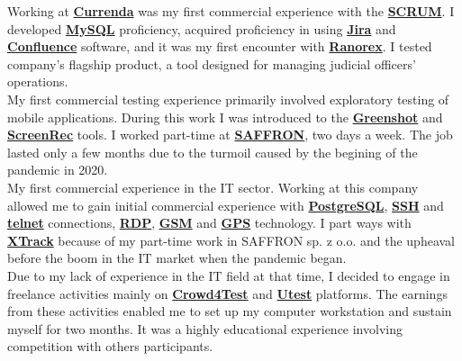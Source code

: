 \begin{rightcolumn}
            {Working at \href{https://www.currenda.pl/}{\textbf{Currenda}} was my first commercial experience with the \href{https://www.scrum.org/}{\textbf{SCRUM}}. I developed \href{https://www.mysql.com/}{\textbf{MySQL}} proficiency, acquired proficiency in using \href{https://www.atlassian.com/pl/software/jira}{\textbf{Jira}} and \href{https://www.atlassian.com/pl/software/confluence}{\textbf{Confluence}} software, and it was my first encounter with \href{https://www.ranorex.com/}{\textbf{Ranorex}}. I tested company's flagship product, a tool designed for managing judicial officers' operations.}
        \vspace{\itemspace}\\
            {My first commercial testing experience primarily involved exploratory testing of mobile applications. During this work I was introduced to the \href{https://getgreenshot.org/}{\textbf{Greenshot}} and \href{https://screenrec.com/}{\textbf{ScreenRec}} tools. I worked part-time at \href{https://saffron.pl/}{\textbf{SAFFRON}}, two days a week. The job lasted only a few months due to the turmoil caused by the begining of the pandemic in 2020.}
        \vspace{\itemspace}\\
            {My first commercial experience in the IT sector. Working at this company allowed me to gain initial commercial experience with \href{https://www.postgresql.org/}{\textbf{PostgreSQL}}, \href{https://www.openssh.com/}{\textbf{SSH}} and \href{https://www.telnet.org/}{\textbf{telnet}} connections, \href{https://learn.microsoft.com/en-us/windows/security/identity-protection/hello-for-business/hello-feature-remote-desktop}{\textbf{RDP}}, \href{https://www.gsma.com/}{\textbf{GSM}} and \href{https://www.gps.gov/}{\textbf{GPS}} technology. I part ways with \href{https://xtrack.com/}{\textbf{XTrack}} because of my part-time work in SAFFRON sp. z o.o. and the upheaval before the boom in the IT market when the pandemic began.}
        \vspace{\itemspace}\\
            {Due to my lack of experience in the IT field at that time, I decided to engage in freelance activities mainly on \href{https://www.crowd4test.com/}{\textbf{Crowd4Test}} and \href{https://www.utest.com/}{\textbf{Utest}} platforms. The earnings from these activities enabled me to set up my computer workstation and sustain myself for two months. It was a highly educational experience involving competition with others participants.}

\end{rightcolumn}
